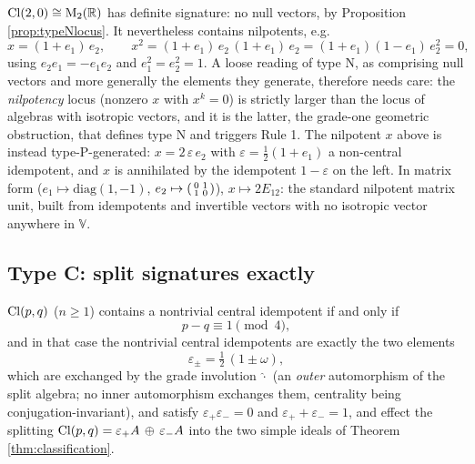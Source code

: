 \begin{example}\label{ex:cl20}
$\mathrm{Cl}(2,0) \cong \mathrm{M}_2(\mathbb{R})$ has definite signature: no null vectors, by Proposition \ref{prop:typeNlocus}. It nevertheless contains nilpotents, e.g.
\[
x = (1 + e_1)\,e_2, \qquad x^2 = (1+e_1)\,e_2\,(1+e_1)\,e_2 = (1+e_1)(1-e_1)\,e_2^2 = 0,
\]
using $e_2 e_1 = -e_1 e_2$ and $e_1^2 = e_2^2 = 1$. A loose reading of type N, as comprising null vectors and more generally the elements they generate, therefore needs care: the \emph{nilpotency} locus (nonzero $x$ with $x^k = 0$) is strictly larger than the locus of algebras with isotropic vectors, and it is the latter, the grade-one geometric obstruction, that defines type N and triggers Rule 1. The nilpotent $x$ above is instead type-P-generated: $x = 2\,\varepsilon\, e_2$ with $\varepsilon = \tfrac12(1 + e_1)$ a non-central idempotent, and $x$ is annihilated by the idempotent $1 - \varepsilon$ on the left. In matrix form ($e_1 \mapsto \mathrm{diag}(1,-1)$, $e_2 \mapsto \begin{psmallmatrix} 0 & 1 \\ 1 & 0\end{psmallmatrix}$), $x \mapsto 2E_{12}$: the standard nilpotent matrix unit, built from idempotents and invertible vectors with no isotropic vector anywhere in $\mathbb{V}$.
\end{example}

\subsection{Type C: split signatures exactly}

\begin{theorem}\label{thm:typeC}
$\mathrm{Cl}(p,q)$ ($n \geq 1$) contains a nontrivial central idempotent if and only if
\[
p - q \equiv 1 \pmod 4 ,
\]
and in that case the nontrivial central idempotents are exactly the two elements
\[
\varepsilon_\pm = \tfrac12\,(1 \pm \omega),
\]
which are exchanged by the grade involution $\hat{\cdot}$ (an \emph{outer} automorphism of the split algebra; no inner automorphism exchanges them, centrality being conjugation-invariant), and satisfy $\varepsilon_+ \varepsilon_- = 0$ and $\varepsilon_+ + \varepsilon_- = 1$, and effect the splitting $\mathrm{Cl}(p,q) = \varepsilon_+ A \,\oplus\, \varepsilon_- A$ into the two simple ideals of Theorem \ref{thm:classification}.
\end{theorem}

